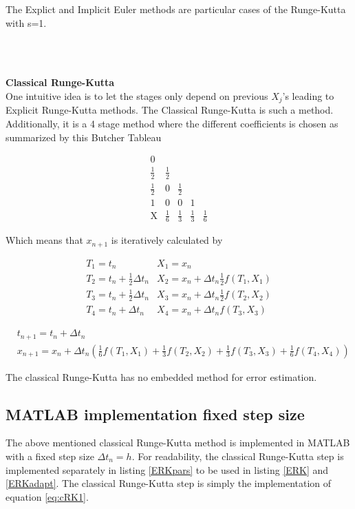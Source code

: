 The Explict and Implicit Euler methods are particular cases of the Runge-Kutta with s=1.

\\\

\textbf{Classical Runge-Kutta}\\
One intuitive idea is to let the stages only depend on previous $X_j$'s leading to Explicit Runge-Kutta methods. The Classical Runge-Kutta is such a method. Additionally, it is a 4 stage method where the different coefficients is chosen as summarized by this Butcher Tableau \cite{JrgensenRunge-KuttaEquations}

$$
\begin{array}{c|cccc}
0 & & & & \\
\frac{1}{2} & \frac{1}{2} & & & \\
\frac{1}{2} & 0 & \frac{1}{2} & & \\
1 & 0 & 0 & 1 & \\
\hline \mathrm{X} & \frac{1}{6} & \frac{1}{3} & \frac{1}{3} & \frac{1}{6}
\end{array}
$$

Which means that $x_{n+1}$ is iteratively calculated by

\begin{equation*}
\begin{array}{ll}
T_{1}=t_{n} & X_{1}=x_{n} \\
T_{2}=t_{n}+\frac{1}{2} \Delta t_n & X_{2}=x_{n}+\Delta t_n \frac{1}{2} f\left(T_{1}, X_{1}\right) \\
T_{3}=t_{n}+\frac{1}{2} \Delta t_n & X_{3}=x_{n}+\Delta t_n \frac{1}{2} f\left(T_{2}, X_{2}\right) \\
T_{4}=t_{n}+\Delta t_n & X_{4}=x_{n}+\Delta t_n f\left(T_{3}, X_{3}\right)
\end{array}
\end{equation*}

\begin{equation}
\label{eq:cRK1}
\begin{aligned}
&t_{n+1}=t_{n}+\Delta t_n \\
&x_{n+1}=x_{n}+\Delta t_n\left(\frac{1}{6} f\left(T_{1}, X_{1}\right)+\frac{1}{3} f\left(T_{2}, X_{2}\right)+\frac{1}{3} f\left(T_{3}, X_{3}\right)+\frac{1}{6} f\left(T_{4}, X_{4}\right)\right)
\end{aligned}
\end{equation}

The classical Runge-Kutta has no embedded method for error estimation.

\subsection{MATLAB implementation fixed step size}
The above mentioned classical Runge-Kutta method is implemented in MATLAB with a fixed step size $\Delta t_n = h$. For readability, the classical Runge-Kutta step is implemented separately in listing \ref{ERKpars} to be used in listing \ref{ERK} and \ref{ERKadapt}. The classical Runge-Kutta step is simply the implementation of equation \ref{eq:cRK1}.

